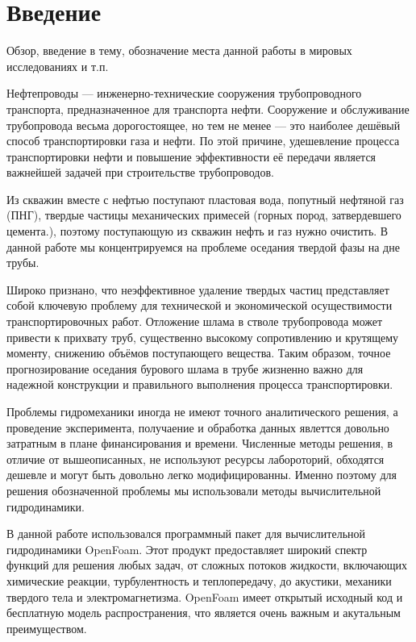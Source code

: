 \chapter*{Введение}							%
Обзор, введение в тему, обозначение места данной работы в мировых исследованиях и т.п.

Нефтепроводы — инженерно-технические сооружения трубопроводного транспорта, предназначенное для транспорта нефти.  Сооружение и обслуживание трубопровода весьма дорогостоящее, но тем не менее — это наиболее дешёвый способ транспортировки газа и нефти. По этой причине, удешевление процесса транспортировки нефти и повышение эффективности её передачи является важнейшей задачей при строительстве трубопроводов.

Из скважин вместе с нефтью поступают пластовая вода, попутный нефтяной газ (ПНГ), твердые частицы механических примесей (горных пород, затвердевшего цемента.), поэтому поступающую из скважин нефть и газ нужно очистить. В данной работе мы концентрируемся на проблеме оседания твердой фазы на дне трубы.

Широко признано, что неэффективное удаление твердых частиц представляет собой ключевую проблему для технической и экономической осуществимости транспортировочных работ. Отложение шлама в стволе трубопровода может привести к прихвату труб, существенно высокому сопротивлению и крутящему моменту, снижению объёмов поступающего вещества. Таким образом, точное прогнозирование оседания бурового шлама в трубе жизненно важно для надежной конструкции и правильного выполнения процесса транспортировки.

Проблемы гидромеханики иногда не имеют точного аналитического решения, а проведение эксперимента, получаение и обработка данных явлеттся довольно затратным в плане финансирования и времени. Численные методы решения, в отличие от вышеописанных, не используют ресурсы лабороторий, обходятся дешевле и могут быть довольно легко модифицированны. Именно поэтому для решения обозначенной проблемы мы использовали методы вычислительной гидродинамики. 

В данной работе использовался программный пакет для вычислительной гидродинамики OpenFoam. Этот продукт предоставляет широкий спектр функций для решения любых задач, от сложных потоков жидкости, включающих химические реакции, турбулентность и теплопередачу, до акустики, механики твердого тела и электромагнетизма. OpenFoam имеет открытый исходный код и бесплатную модель распространения, что является очень важным и акутальным преимуществом.


